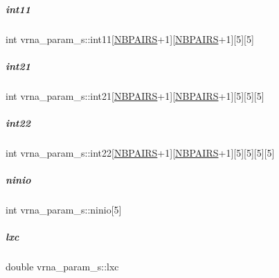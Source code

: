 \mbox{\label{group__energy__parameters_a585e235827774a0073be22bf00e48c30}} 
\subparagraph{\texorpdfstring{int11}{int11}}
{\footnotesize\ttfamily int vrna\+\_\+param\+\_\+s\+::int11\mbox{[}\mbox{\hyperlink{energy__const_8h_a5e75221c779d618eab81e096f37e32ce}{N\+B\+P\+A\+I\+RS}}+1\mbox{]}\mbox{[}\mbox{\hyperlink{energy__const_8h_a5e75221c779d618eab81e096f37e32ce}{N\+B\+P\+A\+I\+RS}}+1\mbox{]}\mbox{[}5\mbox{]}\mbox{[}5\mbox{]}}

\mbox{\label{group__energy__parameters_a983245e30d7a41a3102e5e5ea4bec7e2}} 
\subparagraph{\texorpdfstring{int21}{int21}}
{\footnotesize\ttfamily int vrna\+\_\+param\+\_\+s\+::int21\mbox{[}\mbox{\hyperlink{energy__const_8h_a5e75221c779d618eab81e096f37e32ce}{N\+B\+P\+A\+I\+RS}}+1\mbox{]}\mbox{[}\mbox{\hyperlink{energy__const_8h_a5e75221c779d618eab81e096f37e32ce}{N\+B\+P\+A\+I\+RS}}+1\mbox{]}\mbox{[}5\mbox{]}\mbox{[}5\mbox{]}\mbox{[}5\mbox{]}}

\mbox{\label{group__energy__parameters_ad56fdeadc2a2e51b9f23b2c26d067ec4}} 
\subparagraph{\texorpdfstring{int22}{int22}}
{\footnotesize\ttfamily int vrna\+\_\+param\+\_\+s\+::int22\mbox{[}\mbox{\hyperlink{energy__const_8h_a5e75221c779d618eab81e096f37e32ce}{N\+B\+P\+A\+I\+RS}}+1\mbox{]}\mbox{[}\mbox{\hyperlink{energy__const_8h_a5e75221c779d618eab81e096f37e32ce}{N\+B\+P\+A\+I\+RS}}+1\mbox{]}\mbox{[}5\mbox{]}\mbox{[}5\mbox{]}\mbox{[}5\mbox{]}\mbox{[}5\mbox{]}}

\mbox{\label{group__energy__parameters_ac03c4835310b225a64ea9eb77a174940}} 
\subparagraph{\texorpdfstring{ninio}{ninio}}
{\footnotesize\ttfamily int vrna\+\_\+param\+\_\+s\+::ninio\mbox{[}5\mbox{]}}

\mbox{\label{group__energy__parameters_a24ea058414d3fb918c7fbf189a4a1e51}} 
\subparagraph{\texorpdfstring{lxc}{lxc}}
{\footnotesize\ttfamily double vrna\+\_\+param\+\_\+s\+::lxc}

